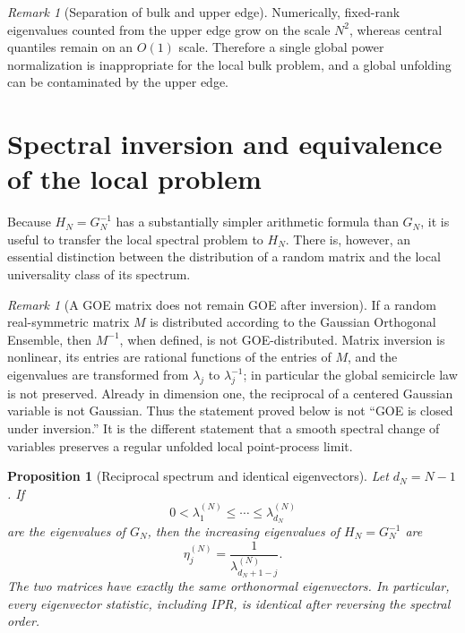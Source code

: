\documentclass[11pt]{amsart}
\numberwithin{equation}{section}
\theoremstyle{plain}
\newtheorem{proposition}[theorem]{Proposition}
\theoremstyle{definition}
\theoremstyle{remark}
\newtheorem{remark}[theorem]{Remark}
\begin{document}
\begin{remark}[Separation of bulk and upper edge]
\label{rem:edge_bulk_separation}
Numerically, fixed-rank eigenvalues counted from the upper edge grow on the scale $N^2$, whereas central quantiles remain on an $O(1)$ scale.  Therefore a single global power normalization is inappropriate for the local bulk problem, and a global unfolding can be contaminated by the upper edge.
\end{remark}

\section{Spectral inversion and equivalence of the local problem}
\label{sec:spectral_inversion}

Because $H_N=G_N^{-1}$ has a substantially simpler arithmetic formula than $G_N$, it is useful to transfer the local spectral problem to $H_N$.  There is, however, an essential distinction between the distribution of a random matrix and the local universality class of its spectrum.

\begin{remark}[A GOE matrix does not remain GOE after inversion]
\label{rem:inverse_not_goe_ensemble}
If a random real-symmetric matrix $M$ is distributed according to the Gaussian Orthogonal Ensemble, then $M^{-1}$, when defined, is not GOE-distributed.  Matrix inversion is nonlinear, its entries are rational functions of the entries of $M$, and the eigenvalues are transformed from $\lambda_j$ to $\lambda_j^{-1}$; in particular the global semicircle law is not preserved.  Already in dimension one, the reciprocal of a centered Gaussian variable is not Gaussian.  Thus the statement proved below is not ``GOE is closed under inversion.''  It is the different statement that a smooth spectral change of variables preserves a regular unfolded local point-process limit.
\end{remark}

\begin{proposition}[Reciprocal spectrum and identical eigenvectors]
\label{prop:reciprocal_spectrum}
Let $d_N=N-1$.  If
\begin{equation}
0<\lambda_1^{(N)}\le\cdots\le\lambda_{d_N}^{(N)}
\end{equation}
are the eigenvalues of $G_N$, then the increasing eigenvalues of $H_N=G_N^{-1}$ are
\begin{equation}
\eta_j^{(N)}=\frac{1}{\lambda_{d_N+1-j}^{(N)}}.
\label{eq:reciprocal_eigenvalues}
\end{equation}
The two matrices have exactly the same orthonormal eigenvectors.  In particular, every eigenvector statistic, including IPR, is identical after reversing the spectral order.
\end{proposition}
\end{document}
